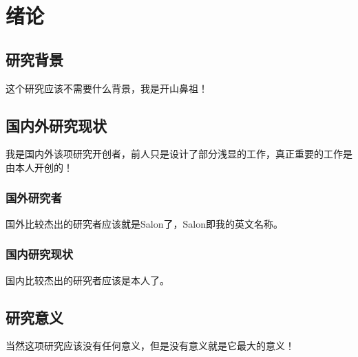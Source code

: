 \newpage
\pagestyle{plain}
\setcounter{page}{1}
\chapter{绪论}
\section{研究背景}
    这个研究应该不需要什么背景，我是开山鼻祖！

\section{国内外研究现状}
    我是国内外该项研究开创者，前人只是设计了部分浅显的工作，真正重要的工作是由本人开创的！
\subsection{国外研究者}
    国外比较杰出的研究者应该就是Salon了，Salon即我的英文名称。
    
\subsection{国内研究现状}
    国内比较杰出的研究者应该是本人了。

\section{研究意义}
    当然这项研究应该没有任何意义，但是没有意义就是它最大的意义！










